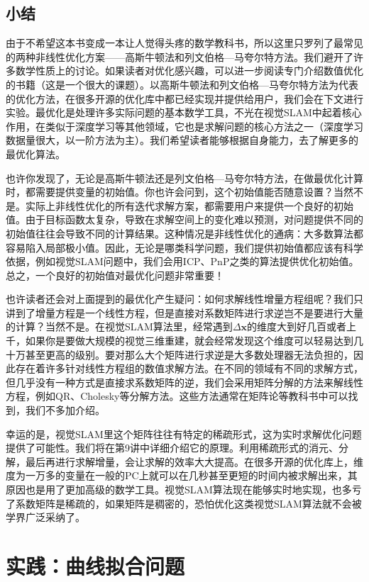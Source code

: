 \subsection{小结}
由于不希望这本书变成一本让人觉得头疼的数学教科书，所以这里只罗列了最常见的两种非线性优化方案——高斯牛顿法和列文伯格—马夸尔特方法。我们避开了许多数学性质上的讨论。如果读者对优化感兴趣，可以进一步阅读专门介绍数值优化的书籍（这是一个很大的课题）\cite{Nocedal2006}。以高斯牛顿法和列文伯格—马夸尔特方法为代表的优化方法，在很多开源的优化库中都已经实现并提供给用户，我们会在下文进行实验。最优化是处理许多实际问题的基本数学工具，不光在视觉SLAM中起着核心作用，在类似于深度学习等其他领域，它也是求解问题的核心方法之一（深度学习数据量很大，以一阶方法为主）。我们希望读者能够根据自身能力，去了解更多的最优化算法。

也许你发现了，无论是高斯牛顿法还是列文伯格—马夸尔特方法，在做最优化计算时，都需要提供变量的初始值。你也许会问到，这个初始值能否随意设置？当然不是。实际上非线性优化的所有迭代求解方案，都需要用户来提供一个良好的初始值。由于目标函数太复杂，导致在求解空间上的变化难以预测，对问题提供不同的初始值往往会导致不同的计算结果。这种情况是非线性优化的通病：大多数算法都容易陷入局部极小值。因此，无论是哪类科学问题，我们提供初始值都应该有科学依据，例如视觉SLAM问题中，我们会用ICP、PnP之类的算法提供优化初始值。总之，一个良好的初始值对最优化问题非常重要！

也许读者还会对上面提到的最优化产生疑问：如何求解线性增量方程组呢？我们只讲到了增量方程是一个线性方程，但是直接对系数矩阵进行求逆岂不是要进行大量的计算？当然不是。在视觉SLAM算法里，经常遇到$\Delta \bm{x}$的维度大到好几百或者上千，如果你是要做大规模的视觉三维重建，就会经常发现这个维度可以轻易达到几十万甚至更高的级别。要对那么大个矩阵进行求逆是大多数处理器无法负担的，因此存在着许多针对线性方程组的数值求解方法。在不同的领域有不同的求解方式，但几乎没有一种方式是直接求系数矩阵的逆，我们会采用矩阵分解的方法来解线性方程，例如QR、Cholesky等分解方法。这些方法通常在矩阵论等教科书中可以找到，我们不多加介绍。

幸运的是，视觉SLAM里这个矩阵往往有特定的稀疏形式，这为实时求解优化问题提供了可能性。我们将在第9讲中详细介绍它的原理。利用稀疏形式的消元、分解，最后再进行求解增量，会让求解的效率大大提高。在很多开源的优化库上，维度为一万多的变量在一般的PC上就可以在几秒甚至更短的时间内被求解出来，其原因也是用了更加高级的数学工具。视觉SLAM算法现在能够实时地实现，也多亏了系数矩阵是稀疏的，如果矩阵是稠密的，恐怕优化这类视觉SLAM算法就不会被学界广泛采纳了\textsuperscript{\cite{Lourakis2009, Sibley2009a, Triggs2000}}。

\section{实践：曲线拟合问题}

